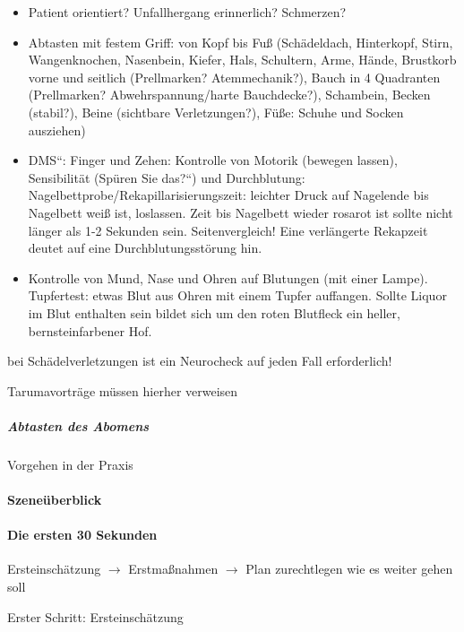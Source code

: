 \documentclass{article}
\begin{document}
\begin{itemize}
\item Patient orientiert? Unfallhergang erinnerlich? Schmerzen?

\end{itemize}
\begin{itemize}
\item Abtasten mit festem Griff: von Kopf bis Fu{\ss} (Sch\"adeldach,
Hinterkopf, Stirn, Wangenknochen, Nasenbein, Kiefer, Hals, Schultern,
Arme, H\"ande, Brustkorb vorne und seitlich (Prellmarken?
Atemmechanik?), Bauch in 4 Quadranten (Prellmarken?
Abwehrspannung/harte Bauchdecke?), Schambein, Becken (stabil?), Beine
(sichtbare Verletzungen?), F\"u{\ss}e: Schuhe und Socken ausziehen)

\item {\quotedblbase}DMS{\textquotedblleft}: Finger und Zehen: Kontrolle
von Motorik (bewegen lassen), Sensibilit\"at ({\quotedblbase}Sp\"uren
Sie das?{\textquotedblleft}) und Durchblutung:
Nagelbettprobe/Rekapillarisierungszeit: leichter Druck auf Nagelende
bis Nagelbett wei{\ss} ist, loslassen. Zeit bis Nagelbett wieder
rosarot ist sollte nicht l\"anger als 1-2 Sekunden sein.
Seitenvergleich! Eine verl\"angerte Rekapzeit deutet auf eine
Durchblutungsst\"orung hin.

\item Kontrolle von Mund, Nase und Ohren auf Blutungen (mit einer
Lampe). Tupfertest: etwas Blut aus Ohren mit einem Tupfer auffangen.
Sollte Liquor im Blut enthalten sein bildet sich um den roten Blutfleck
ein heller, bernsteinfarbener Hof.

\end{itemize}
bei Sch\"adelverletzungen ist ein Neurocheck auf jeden Fall
erforderlich!

Tarumavortr\"age m\"ussen hierher verweisen

\subparagraph{Abtasten des Abomens }
Vorgehen in der Praxis

\paragraph{Szene\"uberblick}
\paragraph[Die ersten \ \ 30 Sekunden ]{Die ersten  30 Sekunden }
Ersteinsch\"atzung ${\rightarrow}$  Erstma{\ss}nahmen ${\rightarrow}$ 
Plan zurechtlegen wie es weiter gehen soll

Erster Schritt: Ersteinsch\"atzung
\end{document}
